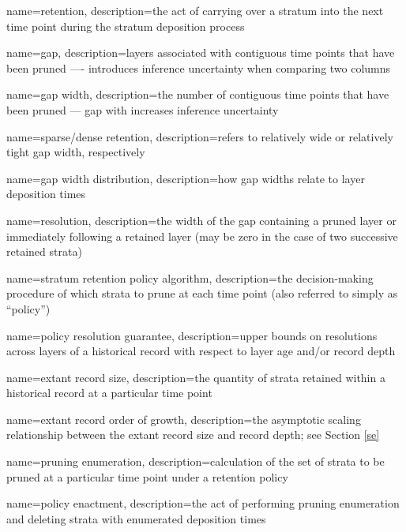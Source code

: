 {
    name=retention,
    description={the act of carrying over a stratum into the next time point during the stratum deposition process}
}

{
    name=gap,
    description={layers associated with contiguous time points that have been pruned ---- introduces inference uncertainty when comparing two columns}
}

{
    name=gap width,
    description={the number of contiguous time points that have been pruned --- gap with increases inference uncertainty}
}

{
    name=sparse/dense retention,
    description={refers to relatively wide or relatively tight gap width, respectively}
}

{
    name=gap width distribution,
    description={how gap widths relate to layer deposition times}
}

{
    name=resolution,
    description={the width of the gap containing a pruned layer or immediately following a retained layer (may be zero in the case of two successive retained strata)}
}

{
    name=stratum retention policy algorithm,
    description={the decision-making procedure of which strata to prune at each time point (also referred to simply as ``policy'')}
}

{
    name=policy resolution guarantee,
    description={upper bounds on resolutions across layers of a historical record with respect to layer age and/or record depth}
}

{
    name=extant record size,
    description={the quantity of strata retained within a historical record at a particular time point}
}

{
    name=extant record order of growth,
    description={the asymptotic scaling relationship between the extant record size and record depth; see Section \ref{se}}
}

{
    name=pruning enumeration,
    description={calculation of the set of strata to be pruned at a particular time point under a retention policy}
}

{
    name=policy enactment,
    description={the act of performing pruning enumeration and deleting strata with enumerated deposition times}
}

